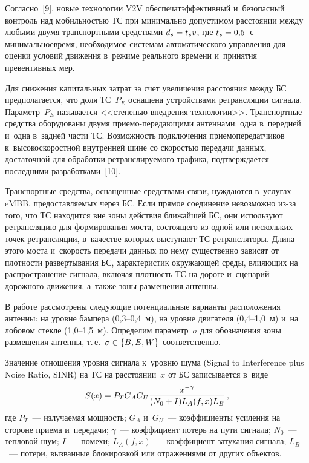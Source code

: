 \begin{multicols}{2}
     Согласно~[9], новые технологии V2V обеспечат\linebreak эффективный 
и~безопасный контроль над мобильностью ТС при минимально допустимом 
расстоянии между любыми двумя транспортными средствами $d_s\hm= t_s 
v$, где $t_s\hm=0{,}5$~с~--- минимальное\linebreak время, необходимое сис\-те\-мам 
автоматического управ\-ле\-ния для оценки условий движения в~режиме 
реального времени и~принятия превентивных мер.
     
     Для снижения капитальных затрат за счет увеличения расстояния 
между БС предполагается, что доля ТС~$P_E$ оснащена устройствами 
ретрансляции сигнала. Параметр~$P_E$ называется <<сте\-пенью внед\-ре\-ния 
технологии>>. Транспортные средства обору\-до\-ва\-ны двумя при\-емо-пе\-ре\-да\-ющи\-ми антеннами:
одна в~передней и~одна в~задней части ТС. Возможность подключения 
приемопередатчиков к~высокоскоростной внут\-рен\-ней шине со ско\-ростью 
\mbox{передачи} данных, достаточной для обработки {ретранслируемого} трафика, 
под\-тверж\-да\-ет\-ся последними разработками~[10].
     
     Транспортные средства, оснащенные средствами связи, нуждаются 
в~услугах eMBB, предостав\-ля\-емых через БС. Если прямое соединение 
невозможно из-за того, что ТС находится вне зоны действия ближайшей БС, 
они используют ретрансляцию для формирования моста, состоящего из 
одной или нескольких точек ретрансляции, в~качестве которых выступают 
ТС-ре\-транс\-ля\-то\-ры. Длина этого моста и~скорость передачи данных по 
нему существенно зависят от плотности развертывания БС, характеристик 
окружающей среды, влияющих на распространение сигнала, включая 
плотность ТС на дороге и~сценарий дорожного движения, а~также зоны 
размещения антенны.
     
     В работе рассмотрены следующие потенциальные варианты 
расположения антенны: на уровне бампера (0,3--0,4~м), на уровне двигателя 
(0,4--1,0~м) и~на лобовом стекле (1,0--1,5~м). Определим параметр~$\sigma$ 
для обозначения зоны размещения антенны, т.\,е.\ $\sigma\hm\in \{B,E,W\}$ 
соответственно.
     
     Значение отношения уровня сигнала к~уровню шума (Signal to 
Interference plus Noise Ratio, SINR) на ТС на расстоянии~$x$ от БС 
записывается в~виде
     \begin{equation*}
     S(x)= P_T G_A G_U \displaystyle\frac{\displaystyle x^{-\gamma}\mathstrut}{\displaystyle (N_0+I)L_A (f,x) 
L_B\mathstrut}\,,
     \end{equation*}
где $P_T$~--- излучаемая мощность; $G_A$ и~$G_U$~--- коэффициенты 
усиления на стороне приема и~передачи; $\gamma$~--- коэффициент потерь 
на пути сигнала; $N_0$~--- тепловой шум; $I$~--- помехи; $L_A(f,x)$~--- 
коэффициент затухания сигнала; $L_B$~--- потери, вызванные блокировкой 
или отражениями от других объектов.


\end{multicols}
